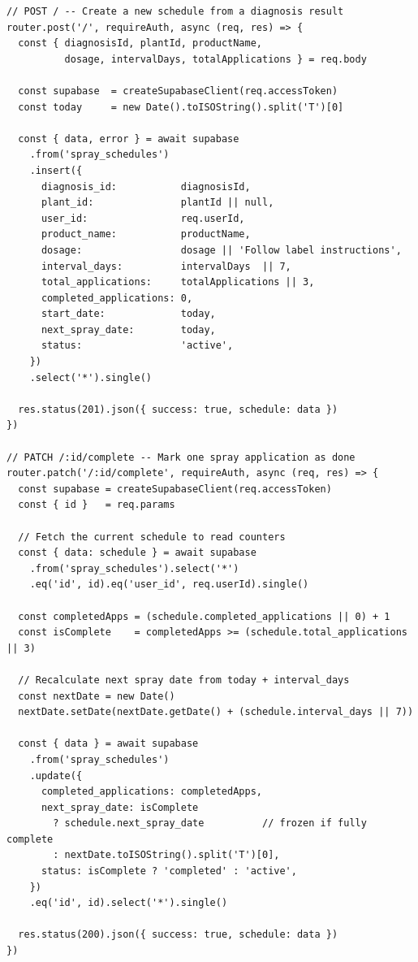 \documentclass[12pt,a4paper]{report}
\begin{document}
\begin{lstlisting}[style=typescript, caption={Spray schedule creation and mark-complete endpoints (api/routes/schedules.ts)}]
// POST / -- Create a new schedule from a diagnosis result
router.post('/', requireAuth, async (req, res) => {
  const { diagnosisId, plantId, productName,
          dosage, intervalDays, totalApplications } = req.body

  const supabase  = createSupabaseClient(req.accessToken)
  const today     = new Date().toISOString().split('T')[0]

  const { data, error } = await supabase
    .from('spray_schedules')
    .insert({
      diagnosis_id:           diagnosisId,
      plant_id:               plantId || null,
      user_id:                req.userId,
      product_name:           productName,
      dosage:                 dosage || 'Follow label instructions',
      interval_days:          intervalDays  || 7,
      total_applications:     totalApplications || 3,
      completed_applications: 0,
      start_date:             today,
      next_spray_date:        today,
      status:                 'active',
    })
    .select('*').single()

  res.status(201).json({ success: true, schedule: data })
})

// PATCH /:id/complete -- Mark one spray application as done
router.patch('/:id/complete', requireAuth, async (req, res) => {
  const supabase = createSupabaseClient(req.accessToken)
  const { id }   = req.params

  // Fetch the current schedule to read counters
  const { data: schedule } = await supabase
    .from('spray_schedules').select('*')
    .eq('id', id).eq('user_id', req.userId).single()

  const completedApps = (schedule.completed_applications || 0) + 1
  const isComplete    = completedApps >= (schedule.total_applications || 3)

  // Recalculate next spray date from today + interval_days
  const nextDate = new Date()
  nextDate.setDate(nextDate.getDate() + (schedule.interval_days || 7))

  const { data } = await supabase
    .from('spray_schedules')
    .update({
      completed_applications: completedApps,
      next_spray_date: isComplete
        ? schedule.next_spray_date          // frozen if fully complete
        : nextDate.toISOString().split('T')[0],
      status: isComplete ? 'completed' : 'active',
    })
    .eq('id', id).select('*').single()

  res.status(200).json({ success: true, schedule: data })
})
\end{lstlisting}
\end{document}
